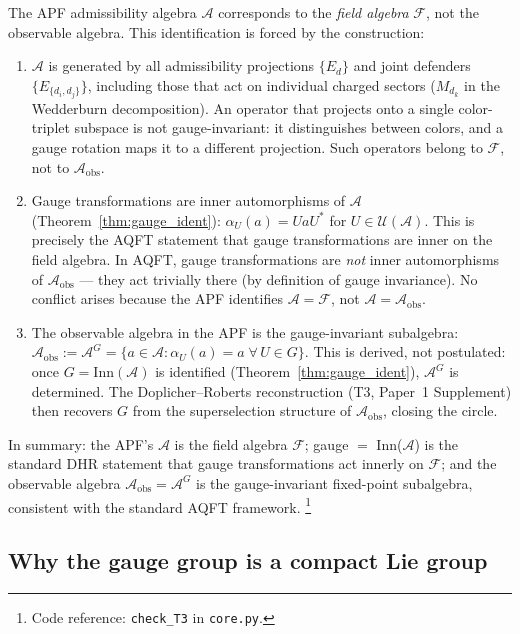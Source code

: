 \documentclass[11pt]{article}
\theoremstyle{definition}
\newcommand{\coderef}[2]{\footnote{Code reference: \texttt{#1} in \texttt{#2}.}}
\begin{document}
The APF admissibility algebra $\mathcal{A}$ corresponds to the
\emph{field algebra} $\mathcal{F}$, not the observable algebra.
This identification is forced by the construction:
\begin{enumerate}[label=(\alph*),nosep]
  \item $\mathcal{A}$ is generated by all admissibility projections
  $\{E_d\}$ and joint defenders $\{E_{\{d_i,d_j\}}\}$, including those
  that act on individual charged sectors ($M_{d_k}$ in the Wedderburn
  decomposition).  An operator that projects onto a single color-triplet
  subspace is not gauge-invariant: it distinguishes between colors, and
  a gauge rotation maps it to a different projection.  Such operators
  belong to $\mathcal{F}$, not to $\mathcal{A}_{\mathrm{obs}}$.
  \item Gauge transformations are inner automorphisms of $\mathcal{A}$
  (Theorem~\ref{thm:gauge_ident}):
  $\alpha_U(a) = UaU^*$ for $U \in \mathcal{U}(\mathcal{A})$.  This
  is precisely the AQFT statement that gauge transformations are inner
  on the field algebra.  In AQFT, gauge transformations are
  \emph{not} inner automorphisms of $\mathcal{A}_{\mathrm{obs}}$ ---
  they act trivially there (by definition of gauge invariance).  No
  conflict arises because the APF identifies
  $\mathcal{A} = \mathcal{F}$, not
  $\mathcal{A} = \mathcal{A}_{\mathrm{obs}}$.
  \item The observable algebra in the APF is the gauge-invariant
  subalgebra: $\mathcal{A}_{\mathrm{obs}} := \mathcal{A}^G =
  \{a \in \mathcal{A} : \alpha_U(a) = a \;\forall\, U \in G\}$.
  This is derived, not postulated: once $G = \mathrm{Inn}(\mathcal{A})$
  is identified (Theorem~\ref{thm:gauge_ident}),
  $\mathcal{A}^G$ is determined.  The
  Doplicher--Roberts reconstruction (T3, Paper~1 Supplement) then
  recovers $G$ from the superselection structure of
  $\mathcal{A}_{\mathrm{obs}}$, closing the circle.
\end{enumerate}
In summary: the APF's $\mathcal{A}$ is the field algebra
$\mathcal{F}$; gauge $=$ Inn($\mathcal{A}$) is the standard
DHR statement that gauge transformations act innerly on
$\mathcal{F}$; and the observable algebra
$\mathcal{A}_{\mathrm{obs}} = \mathcal{A}^G$ is the
gauge-invariant fixed-point subalgebra, consistent with the
standard AQFT framework.
\coderef{check\_T3}{core.py}


\subsection{Why the gauge group is a compact Lie group}
\label{sec:compact_lie}
\end{document}
